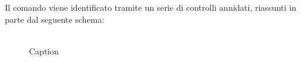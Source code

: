\documentclass[10pt]{article}
\begin{document}
        Il comando viene identificato tramite un serie di controlli annidati, riassunti in parte dal seguente schema: \\ \\
        \begin{figure}
            \centering
            
            \caption{Caption}
            \label{fig:enter-label}
        \end{figure}

        
    
        
        
    

    
\end{document}
